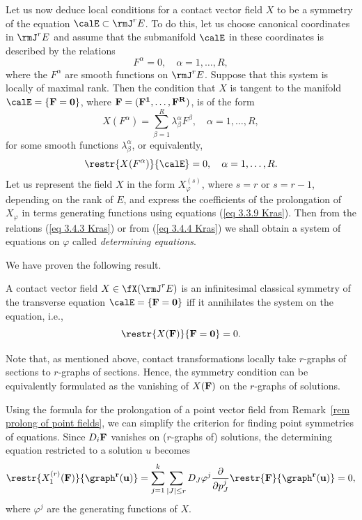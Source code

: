 Let us now deduce local conditions for a contact vector field $X$ to be a symmetry of the equation $\calE\subset\rmJ^rE$. To do this, let us choose canonical coordinates in $\rmJ^rE$ and assume that the submanifold $\calE$ in these coordinates is described by the relations
\[F^\alpha=0,\quad \alpha=1,\ldots,R,\]
where the $F^\alpha$ are smooth functions on $\rmJ^rE$. Suppose that this system is locally of maximal rank. Then the condition that $X$ is tangent to the manifold $\calE=\{\bf{F}=0\}$, where $\bf{F}=(F^1,\ldots,F^R)$, is of the form 
\[X(F^\alpha)=\sum_{\beta=1}^R \lambda^\alpha_\beta F^\beta,\quad \alpha=1,\ldots,R,\label{eq 3.4.3 Kras}\]
for some smooth functions $\lambda^\alpha_\beta$, or equivalently, 
\[\restr{X(F^\alpha)}{\calE}=0,\quad \alpha=1,\ldots,R.\label{eq 3.4.4 Kras}\]
Let us represent the field $X$ in the form $X_\varphi^{(s)}$, where $s=r$ or $s=r-1$, depending on the rank of $E$, and express the coefficients of the prolongation of $X_\varphi$ in terms generating functions using equations (\ref{eq 3.3.9 Kras}). Then from the relations (\ref{eq 3.4.3 Kras}) or from (\ref{eq 3.4.4 Kras}) we shall obtain a system of equations on $\varphi$ called \emph{determining equations}.

We have proven the following result.

\begin{thm}
    A contact vector field $X\in\fX(\rmJ^rE)$ is an infinitesimal classical symmetry of the transverse equation $\calE=\{\bf{F}=0\}$ iff it annihilates the system on the equation, i.e.,
    \[\restr{X(\bf{F})}{\bf{F}=0}=0.\]
\end{thm}

Note that, as mentioned above, contact transformations locally take $r$-graphs of sections to $r$-graphs of sections. Hence, the symmetry condition can be equivalently formulated as the vanishing of $X(\bf{F})$ on the $r$-graphs of solutions. 

\begin{rem}
    Using the formula for the prolongation of a point vector field from Remark~\ref{rem prolong of point fields}, we can simplify the criterion for finding point symmetries of equations. Since $D_i\bf{F}$ vanishes on ($r$-graphs of) solutions, the determining equation restricted to a solution $u$ becomes 
    \[\restr{X_1^{(r)}(\bf{F})}{\graph^r(\bf{u})}=\sum_{j=1}^k \sum_{|J|\leq r} D_J \varphi^j \frac{\partial}{\partial p^j_J}\restr{\bf{F}}{\graph^r(\bf{u})}=0,\]
    where $\varphi^j$ are the generating functions of $X$.
\end{rem}


